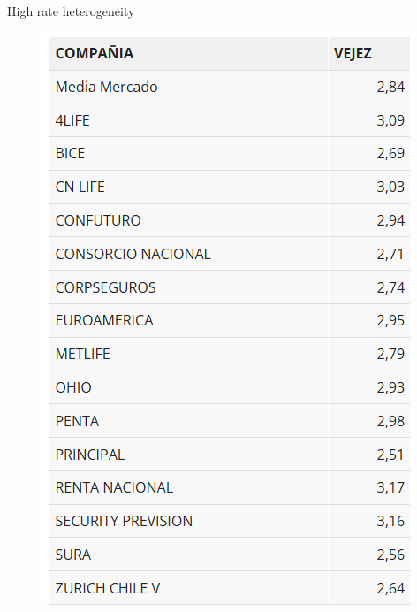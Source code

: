\documentclass[10pt,aspectratio=169]{beamer}
\begin{document}



\begin{frame}{High rate heterogeneity}
\begin{figure}
    \centering
    \includegraphics[width=0.5\linewidth]{../figures/image2.png}
    \label{fig:enter-label}
\end{figure}

 
\end{frame}





\end{document}
